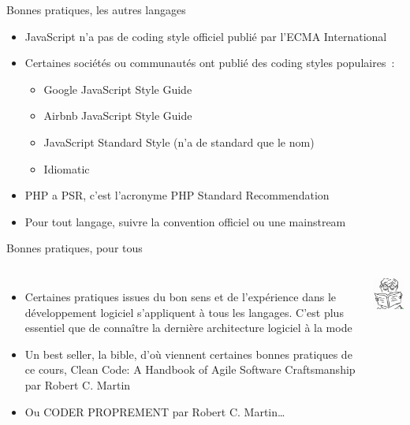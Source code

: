 \documentclass{beamer}
\begin{document}
    \begin{frame}{Bonnes pratiques, les autres langages}

        \begin{itemize}

            \item JavaScript n'a pas de coding style officiel publié par l'ECMA International
            \item Certaines sociétés ou communautés ont publié des coding styles populaires~:

            \begin{itemize}
                \item Google JavaScript Style Guide
                \item Airbnb JavaScript Style Guide
                \item JavaScript Standard Style (n'a de standard que le nom)
                \item Idiomatic
            \end{itemize}
            \item PHP a PSR, c'est l'acronyme PHP Standard Recommendation
            \item Pour tout langage, suivre la convention officiel ou une mainstream

        \end{itemize}

    \end{frame}

    \begin{frame}{Bonnes pratiques, pour tous}
        \begin{columns}
            \begin{itemize}

                \item Certaines pratiques issues du bon sens et de l'expérience dans le développement logiciel s'appliquent à tous les langages.
                C'est plus essentiel que de connaître la dernière architecture logiciel à la mode
                \item Un best seller, la bible, d'où viennent certaines bonnes pratiques de ce cours, Clean Code: A Handbook of Agile Software Craftsmanship par Robert C. Martin
                \item Ou CODER PROPREMENT par Robert C. Martin\ldots

            \end{itemize}
            \centering
            \includegraphics[width=3cm]{image/kid-reading}
        \end{columns}

    \end{frame}
\end{document}
